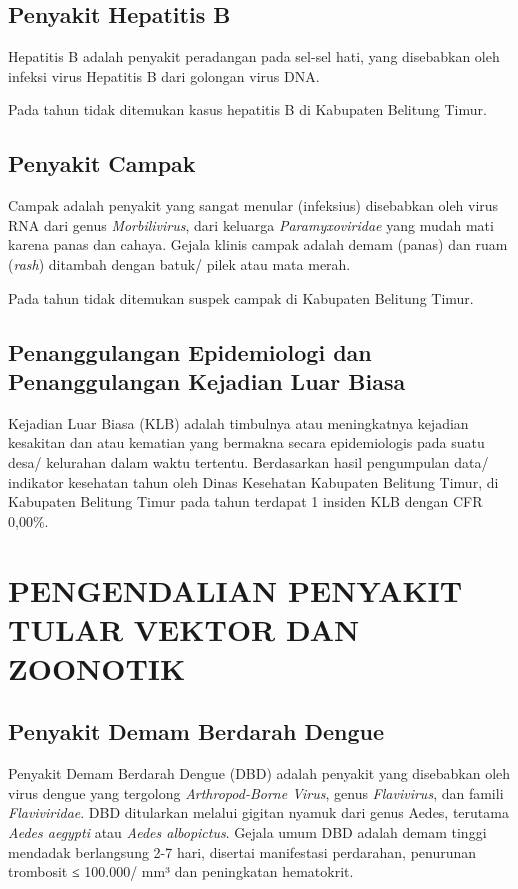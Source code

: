 \subsection{Penyakit Hepatitis B}
Hepatitis B adalah penyakit peradangan pada sel-sel hati, yang disebabkan oleh infeksi virus Hepatitis B dari golongan virus DNA.

Pada tahun \tP tidak ditemukan kasus hepatitis B di Kabupaten Belitung Timur.

\subsection{Penyakit Campak}
Campak adalah penyakit yang sangat menular  (infeksius)  disebabkan  oleh  virus RNA dari genus \emph{Morbilivirus}, dari keluarga \emph{Paramyxoviridae} yang mudah mati karena panas dan cahaya.
Gejala klinis campak adalah demam (panas) dan ruam (\emph{rash}) ditambah dengan batuk/ pilek atau mata merah.

Pada tahun \tP tidak ditemukan suspek campak di Kabupaten Belitung Timur.

\subsection{Penanggulangan Epidemiologi dan Penanggulangan Kejadian Luar Biasa}
Kejadian Luar Biasa (KLB) adalah timbulnya atau meningkatnya kejadian kesakitan dan atau kematian yang bermakna secara epidemiologis pada suatu desa/ kelurahan dalam waktu tertentu.
Berdasarkan hasil pengumpulan data/ indikator kesehatan tahun \tP  oleh Dinas Kesehatan Kabupaten Belitung Timur, di Kabupaten Belitung Timur pada tahun \tP terdapat 1 insiden KLB dengan CFR 0,00\%.

\section[PENGENDALIAN PTVZ]{PENGENDALIAN PENYAKIT TULAR VEKTOR DAN ZOONOTIK}
\subsection{Penyakit Demam Berdarah Dengue}
Penyakit Demam Berdarah Dengue (DBD) adalah penyakit yang disebabkan oleh virus dengue yang tergolong \emph{Arthropod-Borne Virus}, genus \emph{Flavivirus}, dan famili \emph{Flaviviridae}.
DBD ditularkan melalui gigitan nyamuk dari genus Aedes, terutama \emph{Aedes aegypti} atau \emph{Aedes albopictus}.
Gejala umum DBD adalah demam tinggi mendadak berlangsung 2-7 hari, disertai manifestasi perdarahan, penurunan trombosit ≤ 100.000/ mm³ dan peningkatan hematokrit.

